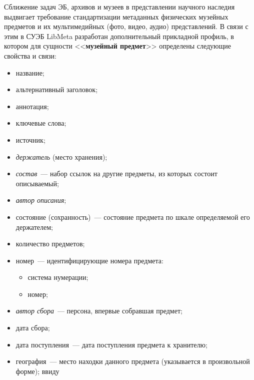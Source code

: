 \begin{multicols}{2}
  Сближение задач ЭБ, архивов и музеев в представлении научного наследия выдвигает 
требование стандартизации метаданных физических музейных предметов и их 
мультимедийных (фото, видео, аудио) представлений. В связи с этим в СУЭБ LibMeta 
разработан дополнительный прикладной профиль, в котором для сущности 
<<\textbf{музейный предмет}>> определены следующие свойства и связи:
  \begin{itemize}
\item название;\\[-14pt]
\item альтернативный заголовок;\\[-14pt]
\item аннотация;\\[-14pt] 
\item ключевые слова;\\[-14pt]
\item источник;\\[-14pt]
\item \textit{держатель} (место хранения);\\[-14pt]
\item \textit{состав}~--- набор ссылок на другие предметы, из которых состоит описываемый;\\[-14pt]
\item \textit{автор описания};\\[-14pt]
\item состояние (сохранность)~--- состояние предмета по шкале определяемой его держателем;
\item количество предметов;\\[-14pt]
\item номер~--- идентифицирующие номера предмета:
\begin{itemize}
\item система нумерации;\\[-14pt]
\item номер;\\[-14pt]
\end{itemize}
\item \textit{автор сбора}~--- персона, впервые собравшая предмет;\\[-14pt]
\item дата сбора;\\[-14pt]
\item дата поступления~--- дата поступления предмета к хранителю;\\[-14pt]
\item география~--- место находки данного предмета (указывается в произвольной форме); ввиду %

\end{itemize}
\end{multicols}
